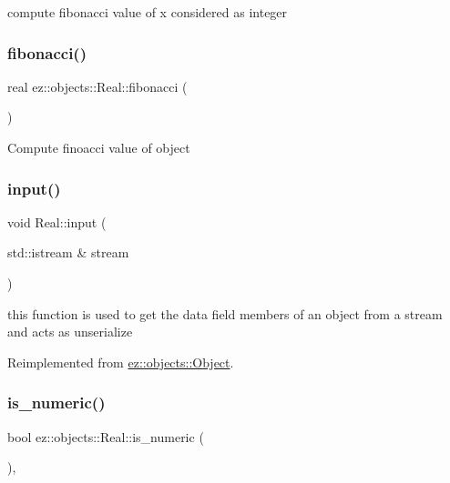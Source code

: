 compute fibonacci value of x considered as integer \mbox{\label{classez_1_1objects_1_1Real_a121a4202e18d893429c5216a42883bb2}} 
\subsubsection{\texorpdfstring{fibonacci()}{fibonacci()}\hspace{0.1cm}{\footnotesize\ttfamily [2/2]}}
{\footnotesize\ttfamily real ez\+::objects\+::\+Real\+::fibonacci (\begin{DoxyParamCaption}{ }\end{DoxyParamCaption})\hspace{0.3cm}{\ttfamily [inline]}}

Compute finoacci value of object \mbox{\label{classez_1_1objects_1_1Real_a89711c886a9569409c7d17530b97bcc5}} 
\subsubsection{\texorpdfstring{input()}{input()}}
{\footnotesize\ttfamily void Real\+::input (\begin{DoxyParamCaption}\item[{std\+::istream \&}]{stream }\end{DoxyParamCaption})\hspace{0.3cm}{\ttfamily [virtual]}}

this function is used to get the data field members of an object from a stream and acts as unserialize 

Reimplemented from \hyperlink{classez_1_1objects_1_1Object_a878bdc53b7f16fda6fa15dab214c4b6a}{ez\+::objects\+::\+Object}.

\mbox{\label{classez_1_1objects_1_1Real_a3b215250b4df60c975bc378792b115b4}} 
\subsubsection{\texorpdfstring{is\+\_\+numeric()}{is\_numeric()}}
{\footnotesize\ttfamily bool ez\+::objects\+::\+Real\+::is\+\_\+numeric (\begin{DoxyParamCaption}{ }\end{DoxyParamCaption})\hspace{0.3cm}{\ttfamily [inline]}, {\ttfamily [virtual]}}

